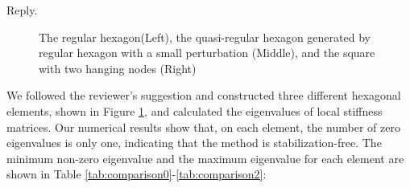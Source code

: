 \documentclass[10pt]{amsart}
\theoremstyle{definition}
\theoremstyle{remark}
\begin{document}
\begin{enumerate}[1.]
\smallskip \noindent \textcolor[rgb]{1.00,0.00,0.00}{Reply.}
\begin{figure}[h]
\centering
{}
\caption{The regular hexagon(Left), the quasi-regular hexagon generated by regular
    hexagon with a small perturbation (Middle), 
and the square with two hanging nodes (Right)}
  \label{fig:hexagon} %
\end{figure}

We followed the reviewer's suggestion and constructed three different hexagonal
elements, shown in Figure \ref{fig:hexagon}, and calculated the eigenvalues of local stiffness
matrices. Our numerical results show that, on each element, the number of zero
eigenvalues is only one, indicating that the method is stabilization-free. The
minimum non-zero eigenvalue and the maximum eigenvalue for each element are
shown in Table \ref{tab:comparison0}-\ref{tab:comparison2}:


\end{enumerate}
\end{document}
